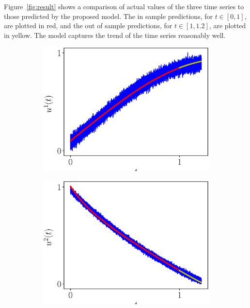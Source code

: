 \documentclass[a4paper,11pt]{elsarticle}
\begin{document}
Figure~\ref{fig:result} shows a comparison of actual values of the
three time series to those predicted by the proposed model. The in
sample predictions, for $t \in [0,1]$, are plotted in red, and the out
of sample predictions, for $t \in [1,1.2]$, are plotted in yellow. The
model captures the trend of the time series reasonably well.

\begin{figure}[!h]

  \centering
  
  \begin{subfigure}{0.325\textwidth}
    \centering
    \includegraphics[width=\linewidth, bb=0 0 461 346, trim={0.2cm 0cm 1.5cm 1cm}, clip]{u1-t.eps}
  \end{subfigure}
  \hfill
  \begin{subfigure}{0.325\textwidth}
    \centering
    \includegraphics[width=\linewidth, bb=0 0 461 346, trim={0.2cm 0cm 1.5cm 1cm}, clip]{u2-t.eps}

\end{subfigure}
\end{figure}
\end{document}
